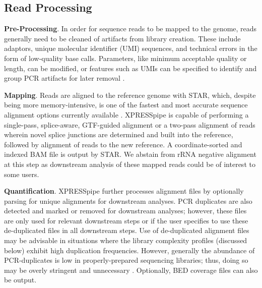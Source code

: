 \documentclass[10pt, oneside]{article}
\begin{document}
\subsection*{Read Processing}
\textbf{Pre-Processing}. In order for sequence reads to be mapped to the genome, reads generally need to be cleaned of artifacts from library creation. These include adaptors, unique molecular identifier (UMI) sequences, and technical errors in the form of low-quality base calls. Parameters, like minimum acceptable quality or length, can be modified, or features such as UMIs can be specified to identify and group PCR artifacts for later removal \cite{umi, umitools}. \par

\noindent\textbf{Mapping}. Reads are aligned to the reference genome with STAR, which, despite being more memory-intensive, is one of the fastest and most accurate sequence alignment options currently available \cite{star, baruzzo_natmeth}. XPRESSpipe is capable of performing a single-pass, splice-aware, GTF-guided alignment or a two-pass alignment of reads wherein novel splice junctions are determined and built into the reference, followed by alignment of reads to the new reference. A coordinate-sorted and indexed BAM file is output by STAR. We abstain from rRNA negative alignment at this step as downstream analysis of these mapped reads could be of interest to some users. \par

\noindent\textbf{Quantification}. XPRESSpipe further processes alignment files by optionally parsing for unique alignments for downstream analyses. PCR duplicates are also detected and marked or removed for downstream analyses; however, these files are only used for relevant downstream steps or if the user specifies to use these de-duplicated files in all downstream steps. Use of de-duplicated alignment files may be advisable in situations where the library complexity profiles (discussed below) exhibit high duplication frequencies. However, generally the abundance of PCR-duplicates is low in properly-prepared sequencing libraries; thus, doing so may be overly stringent and unnecessary \cite{umi}. Optionally, BED coverage files can also be output. \par
\end{document}
